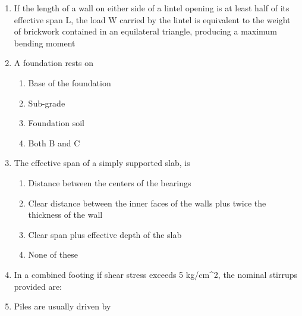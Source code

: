 \documentclass[11pt,a4paper]{article}
\begin{document}
\begin{enumerate}
\begin{enumerate*}[itemjoin=\qquad, label=\Alph*.]
\end{enumerate*}
\item{If the length of a wall on either side of a lintel opening is at least half of its effective span L, the load W carried by the lintel is equivalent to the weight of brickwork contained in an equilateral triangle, producing a maximum bending moment}
\\
\item{A foundation rests on}
\begin{enumerate}[label=\Alph*.]
\item{Base of the foundation}
\item{Sub-grade}
\item{Foundation soil}
\item{Both B and C}
\end{enumerate}
\item{The effective span of a simply supported slab, is}
\begin{enumerate}[label=\Alph*.]
\item{Distance between the centers of the bearings}
\item{Clear distance between the inner faces of the walls plus twice the thickness of the wall}
\item{Clear span plus effective depth of the slab}
\item{None of these}
\end{enumerate}
\item{In a combined footing if shear stress exceeds 5 kg/cm\^{}2, the nominal stirrups provided are:
}
\\
\item{Piles are usually driven by}
\begin{enumerate}[label=\Alph*.]

\end{enumerate}
\end{enumerate}
\end{document}
